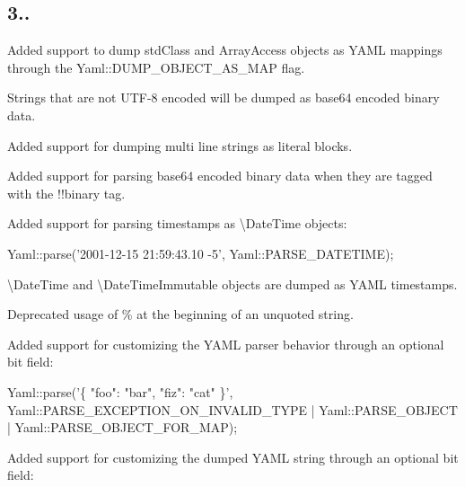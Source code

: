 \subsection*{3.. }


\begin{DoxyItemize}
\item Added support to dump {\ttfamily std\+Class} and {\ttfamily Array\+Access} objects as Y\+A\+ML mappings through the {\ttfamily Yaml\+::\+D\+U\+M\+P\+\_\+\+O\+B\+J\+E\+C\+T\+\_\+\+A\+S\+\_\+\+M\+AP} flag.
\item Strings that are not U\+T\+F-\/8 encoded will be dumped as base64 encoded binary data.
\item Added support for dumping multi line strings as literal blocks.
\item Added support for parsing base64 encoded binary data when they are tagged with the {\ttfamily !!binary} tag.
\item Added support for parsing timestamps as {\ttfamily \textbackslash{}Date\+Time} objects\+:
\end{DoxyItemize}


\begin{DoxyCode}
Yaml::parse(\textcolor{stringliteral}{'2001-12-15 21:59:43.10 -5'}, Yaml::PARSE\_DATETIME);
\end{DoxyCode}



\begin{DoxyItemize}
\item {\ttfamily \textbackslash{}Date\+Time} and {\ttfamily \textbackslash{}Date\+Time\+Immutable} objects are dumped as Y\+A\+ML timestamps.
\item Deprecated usage of {\ttfamily \%} at the beginning of an unquoted string.
\item Added support for customizing the Y\+A\+ML parser behavior through an optional bit field\+:
\end{DoxyItemize}


\begin{DoxyCode}
Yaml::parse(\textcolor{stringliteral}{'\{ "foo": "bar", "fiz": "cat" \}'}, Yaml::PARSE\_EXCEPTION\_ON\_INVALID\_TYPE | Yaml::PARSE\_OBJECT | 
      Yaml::PARSE\_OBJECT\_FOR\_MAP);
\end{DoxyCode}



\begin{DoxyItemize}
\item Added support for customizing the dumped Y\+A\+ML string through an optional bit field\+:
\end{DoxyItemize}


